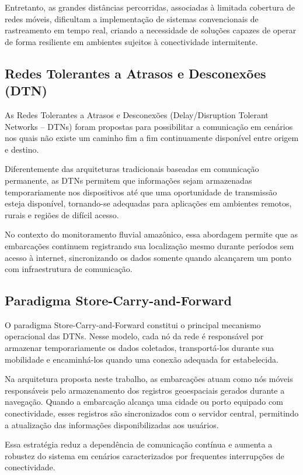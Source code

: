\documentclass[12pt]{article}
\begin{document}
Entretanto, as grandes distâncias percorridas, associadas à limitada cobertura de redes móveis, dificultam a implementação de sistemas convencionais de rastreamento em tempo real, criando a necessidade de soluções capazes de operar de forma resiliente em ambientes sujeitos à conectividade intermitente.

\subsection{Redes Tolerantes a Atrasos e Desconexões (DTN)}
As Redes Tolerantes a Atrasos e Desconexões (Delay/Disruption Tolerant Networks – DTNs) foram propostas para possibilitar a comunicação em cenários nos quais não existe um caminho fim a fim continuamente disponível entre origem e destino.

Diferentemente das arquiteturas tradicionais baseadas em comunicação permanente, as DTNs permitem que informações sejam armazenadas temporariamente nos dispositivos até que uma oportunidade de transmissão esteja disponível, tornando-se adequadas para aplicações em ambientes remotos, rurais e regiões de difícil acesso.

No contexto do monitoramento fluvial amazônico, essa abordagem permite que as embarcações continuem registrando sua localização mesmo durante períodos sem acesso à internet, sincronizando os dados somente quando alcançarem um ponto com infraestrutura de comunicação.

\subsection{Paradigma Store-Carry-and-Forward}
O paradigma Store-Carry-and-Forward constitui o principal mecanismo operacional das DTNs. Nesse modelo, cada nó da rede é responsável por armazenar temporariamente os dados coletados, transportá-los durante sua mobilidade e encaminhá-los quando uma conexão adequada for estabelecida.

Na arquitetura proposta neste trabalho, as embarcações atuam como nós móveis responsáveis pelo armazenamento dos registros geoespaciais gerados durante a navegação. Quando a embarcação alcança uma cidade ou porto equipado com conectividade, esses registros são sincronizados com o servidor central, permitindo a atualização das informações disponibilizadas aos usuários.

Essa estratégia reduz a dependência de comunicação contínua e aumenta a robustez do sistema em cenários caracterizados por frequentes interrupções de conectividade.
\end{document}
